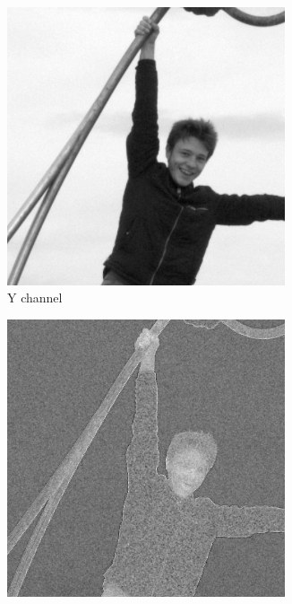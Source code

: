 \begin{figure}[H]
    \centering
    \begin{subfigure}[b]{0.3\textwidth}
        \centering
        \includegraphics[width=0.9\textwidth]{src/assets/tests/Y.png}
        \caption{Y channel}
        \label{fig:tests-Y}
    \end{subfigure}
    \begin{subfigure}[b]{0.3\textwidth}
        \centering
        \includegraphics[width=0.9\textwidth]{src/assets/tests/Cr.png}

\end{subfigure}
\end{figure}
